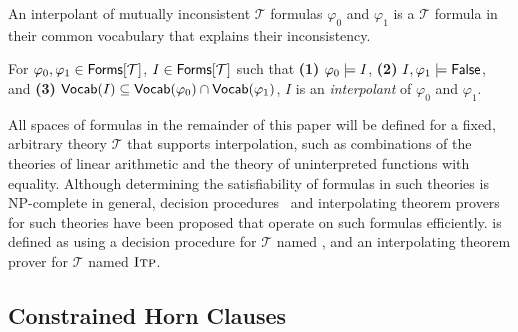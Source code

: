 An interpolant of mutually inconsistent $\mathcal{T}$ formulas
$\varphi_0$ and $\varphi_1$ is a $\mathcal{T}$ formula in their common
vocabulary that explains their inconsistency.
%
\begin{defn}
  \label{defn:itps}
  For $\varphi_0, \varphi_1 \in \mathsf{Forms}[ \mathcal{T} ]$, $I \in
  \mathsf{Forms}[ \mathcal{T} ]$ such that
  \textbf{(1)} $\varphi_0 \models I$, %
  \textbf{(2)} $I, \varphi_1 \models \mathsf{False}$, and %
  \textbf{(3)} $\mathsf{Vocab}(I) \subseteq \mathsf{Vocab}(\varphi_0) \cap
  \mathsf{Vocab}(\varphi_1)$,
  $I$ is an \emph{interpolant} of $\varphi_0$ and $\varphi_1$.
\end{defn}
%
All spaces of formulas in the remainder of this paper will be defined
for a fixed, arbitrary theory $\mathcal{T}$ that supports
interpolation, such as combinations of the theories of linear
arithmetic and the theory of uninterpreted functions with equality.
Although determining the satisfiability of formulas in such theories
is NP-complete in general, decision procedures~\cite{moura08} and
interpolating theorem provers~\cite{mcmillan04} for such theories have
been proposed that operate on such formulas efficiently.
%
\sys is defined as using a decision procedure for $\mathcal{T}$ named
\issat, and an interpolating theorem prover for $\mathcal{T}$ named
$\textsc{Itp}$.

\subsection{Constrained Horn Clauses}
\label{sec:chcs}

